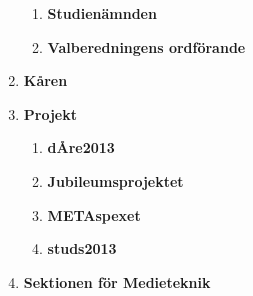 \documentclass{protokoll}
\begin{document}
\begin{enumerate}
\begin{enumerate}
        \item \textbf{Studienämnden}
        \item \textbf{Valberedningens ordförande} 
      \end{enumerate}
    \item \textbf{Kåren}
    \item \textbf{Projekt}
      \begin{enumerate}
        \item \textbf{dÅre2013}
        \item \textbf{Jubileumsprojektet}
        \item \textbf{METAspexet}
        \item \textbf{studs2013}
      \end{enumerate}
    \item \textbf{Sektionen för Medieteknik}
  \end{enumerate}






\end{document}
